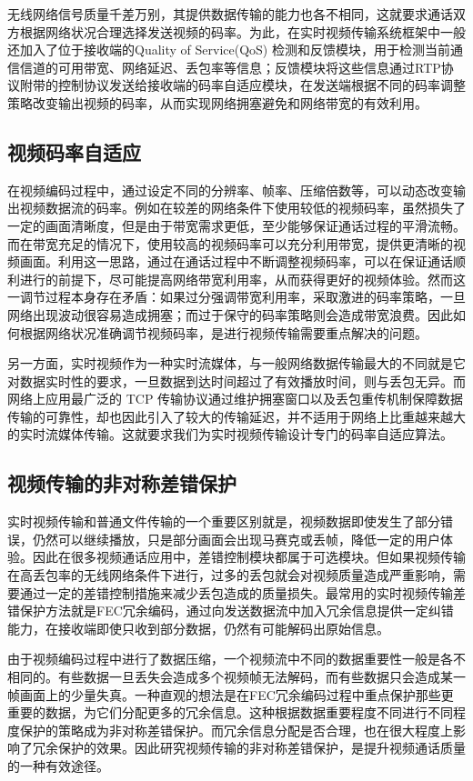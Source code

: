 无线网络信号质量千差万别，其提供数据传输的能力也各不相同，这就要求通话双方根据网络状况合理选择发送视频的码率。为此，在实时视频传输系统框架中一般还加入了位于接收端的Quality of Service(QoS) 检测和反馈模块，用于检测当前通信信道的可用带宽、网络延迟、丢包率等信息；反馈模块将这些信息通过RTP协议附带的控制协议发送给接收端的码率自适应模块，在发送端根据不同的码率调整策略改变输出视频的码率，从而实现网络拥塞避免和网络带宽的有效利用。


\subsection{视频码率自适应}
在视频编码过程中，通过设定不同的分辨率、帧率、压缩倍数等，可以动态改变输出视频数据流的码率。例如在较差的网络条件下使用较低的视频码率，虽然损失了一定的画面清晰度，但是由于带宽需求更低，至少能够保证通话过程的平滑流畅。而在带宽充足的情况下，使用较高的视频码率可以充分利用带宽，提供更清晰的视频画面。利用这一思路，通过在通话过程中不断调整视频码率，可以在保证通话顺利进行的前提下，尽可能提高网络带宽利用率，从而获得更好的视频体验。然而这一调节过程本身存在矛盾：如果过分强调带宽利用率，采取激进的码率策略，一旦网络出现波动很容易造成拥塞；而过于保守的码率策略则会造成带宽浪费。因此如何根据网络状况准确调节视频码率，是进行视频传输需要重点解决的问题。

另一方面，实时视频作为一种实时流媒体，与一般网络数据传输最大的不同就是它对数据实时性的要求，一旦数据到达时间超过了有效播放时间，则与丢包无异。而网络上应用最广泛的 TCP 传输协议通过维护拥塞窗口以及丢包重传机制保障数据传输的可靠性，却也因此引入了较大的传输延迟，并不适用于网络上比重越来越大的实时流媒体传输。这就要求我们为实时视频传输设计专门的码率自适应算法。

\subsection{视频传输的非对称差错保护}
实时视频传输和普通文件传输的一个重要区别就是，视频数据即使发生了部分错误，仍然可以继续播放，只是部分画面会出现马赛克或丢帧，降低一定的用户体验。因此在很多视频通话应用中，差错控制模块都属于可选模块。但如果视频传输在高丢包率的无线网络条件下进行，过多的丢包就会对视频质量造成严重影响，需要通过一定的差错控制措施来减少丢包造成的质量损失。最常用的实时视频传输差错保护方法就是FEC冗余编码，通过向发送数据流中加入冗余信息提供一定纠错能力，在接收端即使只收到部分数据，仍然有可能解码出原始信息。

由于视频编码过程中进行了数据压缩，一个视频流中不同的数据重要性一般是各不相同的。有些数据一旦丢失会造成多个视频帧无法解码，而有些数据只会造成某一帧画面上的少量失真。一种直观的想法是在FEC冗余编码过程中重点保护那些更重要的数据，为它们分配更多的冗余信息。这种根据数据重要程度不同进行不同程度保护的策略成为非对称差错保护。而冗余信息分配是否合理，也在很大程度上影响了冗余保护的效果。因此研究视频传输的非对称差错保护，是提升视频通话质量的一种有效途径。

